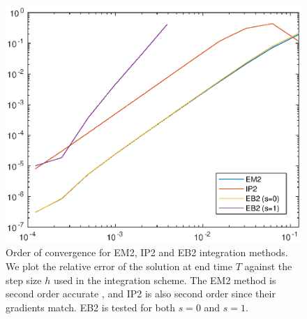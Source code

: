 \begin{figure}
    \centering
    \includegraphics[width=0.75\linewidth]{Matlab/magnusapproximations.eps}
    \caption{
        Order of convergence for EM2, IP2 and EB2 integration methods.
        We plot the relative error of the solution at end time $T$ against the step size $h$ used in the integration scheme.
        The EM2 method is second order accurate \cite{blanes_pos_2022},
        and IP2 is also second order since their gradients match.
        EB2 is tested for both $s=0$ and $s=1$.
    }
    \label{fig:magnusapprxorder}
\end{figure}

